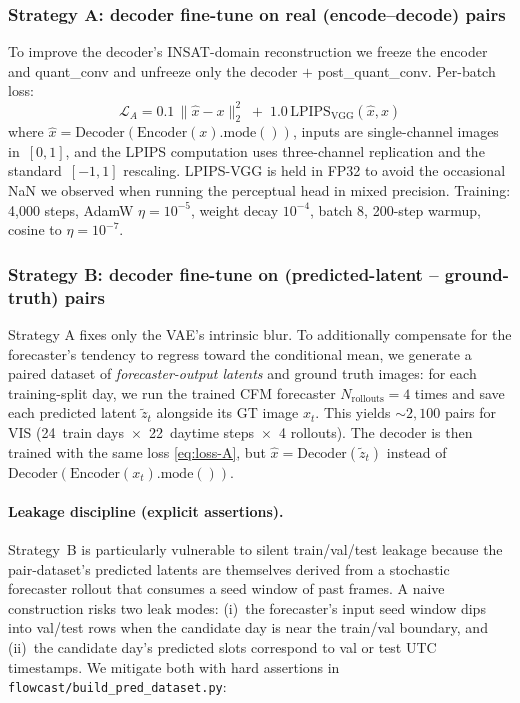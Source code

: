 \documentclass[11pt,a4paper]{article}
\begin{document}
\subsubsection{Strategy A: decoder fine-tune on real (encode--decode) pairs}
\label{sec:flowcast-A}
To improve the decoder's INSAT-domain reconstruction we freeze the encoder
and quant\_conv and unfreeze only the decoder $+$ post\_quant\_conv.
Per-batch loss:
\begin{equation}
\mathcal{L}_A = 0.1\,\|\hat{x} - x\|_2^2 \;+\; 1.0\,\mathrm{LPIPS}_{\text{VGG}}(\hat{x}, x)
\label{eq:loss-A}
\end{equation}
where $\hat{x}=\mathrm{Decoder}(\mathrm{Encoder}(x).\mathrm{mode}())$,
inputs are single-channel images in~$[0,1]$, and the LPIPS computation
uses three-channel replication and the standard~$[-1,1]$ rescaling.
LPIPS-VGG is held in FP32 to avoid the occasional NaN we observed when
running the perceptual head in mixed precision. Training: 4{,}000 steps,
AdamW $\eta=10^{-5}$, weight decay $10^{-4}$, batch 8, 200-step warmup,
cosine to $\eta=10^{-7}$.

\subsubsection{Strategy B: decoder fine-tune on (predicted-latent --
ground-truth) pairs}
\label{sec:flowcast-B}
Strategy A fixes only the VAE's intrinsic blur. To additionally compensate
for the forecaster's tendency to regress toward the conditional mean, we
generate a paired dataset of \emph{forecaster-output latents} and ground
truth images: for each training-split day, we run the trained CFM
forecaster $N_{\text{rollouts}}=4$ times and save each predicted latent
$\tilde z_{t}$ alongside its GT image $x_{t}$. This yields $\sim 2{,}100$
pairs for VIS (24~train days~$\times$~22~daytime steps~$\times$~4
rollouts). The decoder is then trained with the same loss
\cref{eq:loss-A}, but $\hat x = \mathrm{Decoder}(\tilde z_t)$ instead of
$\mathrm{Decoder}(\mathrm{Encoder}(x_t).\mathrm{mode}())$.

\paragraph{Leakage discipline (explicit assertions).} Strategy~B is
particularly vulnerable to silent train/val/test leakage because the
pair-dataset's predicted latents are themselves derived from a stochastic
forecaster rollout that consumes a seed window of past frames. A naive
construction risks two leak modes: (i)~the forecaster's input seed window
dips into val/test rows when the candidate day is near the train/val
boundary, and (ii)~the candidate day's predicted slots correspond to val
or test UTC timestamps. We mitigate both with hard assertions in
\texttt{flowcast/build\_pred\_dataset.py}:
\end{document}
